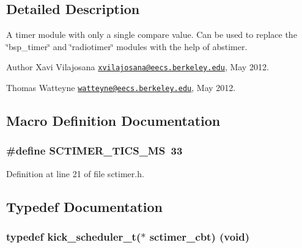 \subsection{Detailed Description}
A timer module with only a single compare value. Can be used to replace the \char`\"{}bsp\+\_\+timer\char`\"{} and \char`\"{}radiotimer\char`\"{} modules with the help of abstimer. 

\begin{DoxyAuthor}{Author}
Xavi Vilajosana \href{mailto:xvilajosana@eecs.berkeley.edu}{\tt xvilajosana@eecs.\+berkeley.\+edu}, May 2012. 

Thomas Watteyne \href{mailto:watteyne@eecs.berkeley.edu}{\tt watteyne@eecs.\+berkeley.\+edu}, May 2012. 
\end{DoxyAuthor}


\subsection{Macro Definition Documentation}
\subsubsection[{\texorpdfstring{S\+C\+T\+I\+M\+E\+R\+\_\+\+T\+I\+C\+S\+\_\+\+MS}{SCTIMER_TICS_MS}}]{\setlength{\rightskip}{0pt plus 5cm}\#define S\+C\+T\+I\+M\+E\+R\+\_\+\+T\+I\+C\+S\+\_\+\+MS~33}\hypertarget{group__sctimer_ga08e4c399d2058414497e57a37033eaf0}{}\label{group__sctimer_ga08e4c399d2058414497e57a37033eaf0}


Definition at line 21 of file sctimer.\+h.



\subsection{Typedef Documentation}
\subsubsection[{\texorpdfstring{sctimer\+\_\+cbt}{sctimer_cbt}}]{\setlength{\rightskip}{0pt plus 5cm}typedef {\bf kick\+\_\+scheduler\+\_\+t}($\ast$ sctimer\+\_\+cbt) ({\bf void})}\hypertarget{group__sctimer_ga0a0d5fd87809e69b643e507977c2f8e4}{}\label{group__sctimer_ga0a0d5fd87809e69b643e507977c2f8e4}


